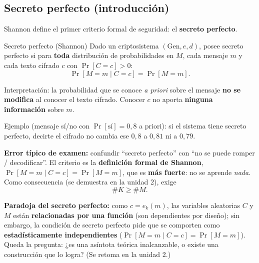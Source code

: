 \documentclass[../main.tex]{subfiles}
\begin{document}
\subsection{Secreto perfecto (introducción)}

Shannon define el primer criterio formal de seguridad: el \textbf{secreto
perfecto}.

\begin{definicion}{Secreto perfecto (Shannon)}
Dado un criptosistema $(\text{Gen}, e, d)$, posee secreto perfecto si para
\textbf{toda} distribución de probabilidades en $M$, cada mensaje $m$ y cada
texto cifrado $c$ con $\Pr[C=c] > 0$:
$$\Pr[M=m \mid C=c] = \Pr[M=m].$$
\end{definicion}

Interpretación: la probabilidad que se conoce \emph{a priori} sobre el mensaje
\textbf{no se modifica} al conocer el texto cifrado. Conocer $c$ no aporta
\textbf{ninguna información} sobre $m$.


Ejemplo (mensaje sí/no con $\Pr[\text{sí}]=0{,}8$ a priori): si el sistema tiene
secreto perfecto, decirte el cifrado no cambia ese $0{,}8$ a $0{,}81$ ni a
$0{,}79$.

\begin{ojo}
\textbf{Error típico de examen:} confundir ``secreto perfecto'' con ``no se
puede romper / decodificar''. El criterio es la \textbf{definición formal de
Shannon}, $\Pr[M=m\mid C=c]=\Pr[M=m]$, que es \textbf{más fuerte}: no se aprende
\emph{nada}. Como consecuencia (se demuestra en la unidad 2), exige
$$\#K \ge \#M.$$
\end{ojo}

\begin{destacado}
\textbf{Paradoja del secreto perfecto:} como $c = e_k(m)$, las variables
aleatorias $C$ y $M$ están \textbf{relacionadas por una función} (son
dependientes por diseño); sin embargo, la condición de secreto perfecto pide que
se comporten como \textbf{estadísticamente independientes}
($\Pr[M=m\mid C=c]=\Pr[M=m]$). Queda la pregunta: ¿es una asíntota teórica
inalcanzable, o existe una construcción que lo logra? (Se retoma en la unidad 2.)
\end{destacado}
\end{document}
